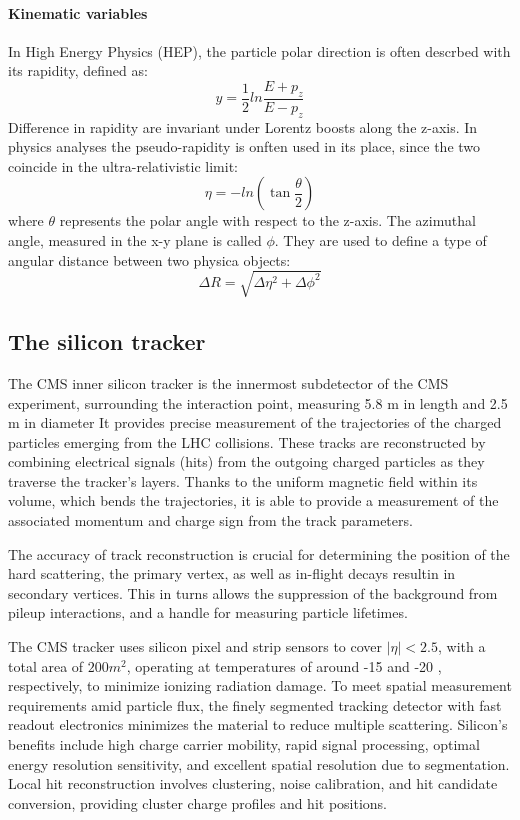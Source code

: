 \paragraph{Kinematic variables\\}
In High Energy Physics (HEP), the particle polar direction is often descrbed with its rapidity, defined as:
\begin{equation}
  \label{eq:rapidityDefinition}
  y = \frac{1}{2} ln \frac{E + p_z}{E - p_z}
\end{equation}
Difference in rapidity are invariant under Lorentz boosts along the z-axis.
In physics analyses the pseudo-rapidity is onften used in its place, since the two coincide in the ultra-relativistic limit:
\begin{equation}
  \label{eq:pseudorapidityDefinition}
  \eta = - ln \left( \tan \frac{\theta}{2} \right)
\end{equation}
where $\theta$ represents the polar angle with respect to the z-axis. The azimuthal angle, measured in the x-y plane is called $\phi$.
They are used to define a type of angular distance between two physica objects:
\begin{equation}
  \label{eq:deltaRDefinition}
  \Delta R = \sqrt{ \Delta \eta^2 + \Delta \phi^2 }
\end{equation}

\subsection{The silicon tracker}
The CMS inner silicon tracker is the innermost subdetector of the CMS experiment, surrounding the interaction point, measuring 5.8 m in length and 2.5 m in diameter
It provides precise measurement of the trajectories of the charged particles emerging from the LHC collisions.
These tracks are reconstructed by combining electrical signals (hits) from the outgoing charged particles as they traverse the tracker's layers.
Thanks to the uniform magnetic field within its volume, which bends the trajectories, it is able to provide a measurement of the associated momentum and charge sign from the track parameters.

The accuracy of track reconstruction is crucial for determining the position of the hard scattering, the primary vertex, as well as in-flight decays resultin in secondary vertices.
This in turns allows the suppression of the background from pileup interactions, and a handle for measuring particle lifetimes.

The CMS tracker uses silicon pixel and strip sensors to cover $|\eta| < 2.5$, with a total area of $200 m^2$,
operating at temperatures of around -15 \Celsius and -20 \Celsius, respectively, to minimize ionizing radiation damage.
To meet spatial measurement requirements amid particle flux, the finely segmented tracking detector with fast readout electronics minimizes the material to reduce multiple scattering.
Silicon's benefits include high charge carrier mobility, rapid signal processing, optimal energy resolution sensitivity, and excellent spatial resolution due to segmentation.
Local hit reconstruction involves clustering, noise calibration, and hit candidate conversion, providing cluster charge profiles and hit positions.

